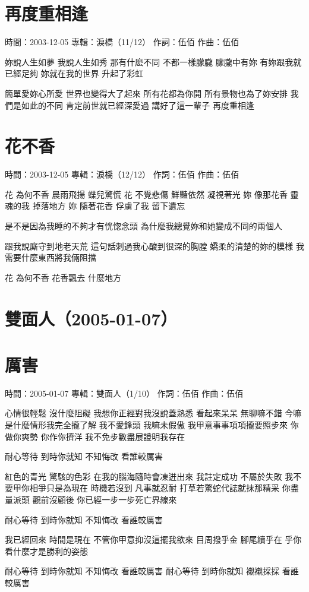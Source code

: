 \documentclass[UTF8,a4paper,oneside,twocolumn,12pt]{ctexbook}
\newcommand{\infopair}[2]{\textbullet #1：#2}
\newcommand{\zc}[1][伍佰]{\infopair{作詞}{#1}}
\newcommand{\zq}[1][伍佰]{\infopair{作曲}{#1}}
\newcommand{\zj}[1]{\infopair{專輯}{#1}}
\newcommand{\sj}[1]{\infopair{時間}{#1}}
\newenvironment{info}{\begin{flushleft}\kaishu
	}
	{\end{flushleft}\normalsize\yahei\par}
\newenvironment{lyric}{
	}
{}
\begin{document}
\section{再度重相逢}
\begin{info}
	\sj{2003-12-05}
	\zj{淚橋（11/12）}
	\zc
	\zq
\end{info}
\begin{lyric}
	妳說人生如夢 我說人生如秀
	那有什麽不同 不都一樣朦朧
	朦朧中有妳 有妳跟我就已經足夠
	妳就在我的世界 升起了彩虹

	簡單愛妳心所愛 世界也變得大了起來
	所有花都為你開 所有景物也為了妳安排
	我們是如此的不同 肯定前世就已經深愛過
	講好了這一輩子 再度重相逢
\end{lyric}

\section{花不香}
\begin{info}
	\sj{2003-12-05}
	\zj{淚橋（12/12）}
	\zc
	\zq
\end{info}
\begin{lyric}
	花 為何不香 晨雨飛揚 蝶兒驚慌
	花 不覺悲傷 鮮豔依然 凝視著光
	妳 像那花香 靈魂的我 掉落地方
	妳 隨著花香 俘虜了我 留下遺忘

	是不是因為我睡的不夠才有恍惚念頭
	為什麼我總覺妳和她變成不同的兩個人

	跟我說廝守到地老天荒
	這句話刺過我心酸到很深的胸膛
	嬌柔的清楚的妳的模樣
	我需要什麼東西將我倆阻擋

	花 為何不香 花香飄去 什麼地方
\end{lyric}

\section*{雙面人（2005-01-07）}
\section{厲害}
\begin{info}
	\sj{2005-01-07}
	\zj{雙面人（1/10）}
	\zc
	\zq
\end{info}
\begin{lyric}
	心情很輕鬆 沒什麼阻礙 我想你正經對我沒說蓋熟悉
	看起來呆呆 無聊嘛不錯 今嘛是什麼情形我完全攏了解
	我不愛鋒頭 我嘛未假傲 我甲意事事項項攏要照步來
	你做你爽勢 你作你擠洋 我不免步數盡展證明我存在

	耐心等待 到時你就知
	不知悔改 看誰較厲害

	紅色的青光 驚駭的色彩 在我的腦海隨時會凍迸出來
	我註定成功 不屬於失敗 我不要甲你相爭只是為現在
	時機若沒到 凡事就忍耐 打草若驚蛇代誌就抹那精采
	你盡量派頭 觀前沒顧後 你已經一步一步死亡界線來

	耐心等待 到時你就知
	不知悔改 看誰較厲害

	我已經回來 時間是現在 不管你甲意抑沒這擺我欲來
	目周撥乎金 腳尾續乎在 乎你看什麼才是勝利的姿態

	耐心等待 到時你就知
	不知悔改 看誰較厲害
	耐心等待 到時你就知
	襯襯採採 看誰較厲害
\end{lyric}
\end{document}
